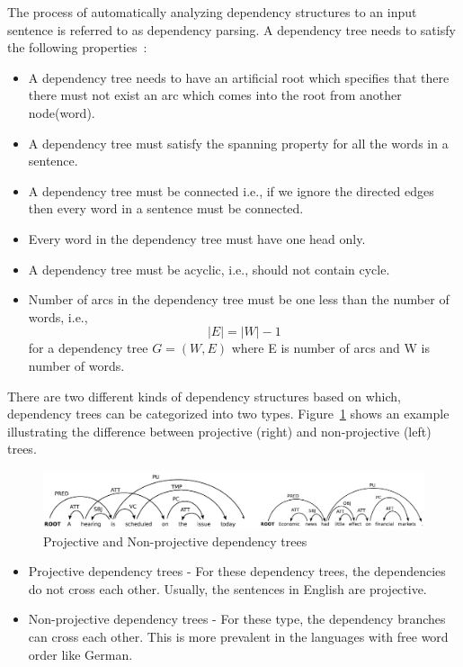 The process of automatically analyzing dependency structures to an input sentence is referred to as dependency parsing. A dependency tree needs to satisfy the following properties~\citep{kubler2009dependency}:
\begin{itemize}
\item A dependency tree needs to have an artificial root which specifies that there there must not exist an arc which comes into the root from another node(word).
\item A dependency tree must satisfy the spanning property for all the words in a sentence.
\item A dependency tree must be connected i.e., if we ignore the directed edges then every word in a sentence must be connected.
\item Every word in the dependency tree must have one head only.
\item A dependency tree must be acyclic, i.e., should not contain cycle.
\item Number of arcs in the dependency tree must be one less than the number of words, i.e., $$|E| = |W| - 1$$ for a dependency tree $G = (W,E)$ where E is number of arcs and W is number of words.
\end{itemize}

There are two different kinds of dependency structures based on which, dependency trees can be categorized into two types. Figure~\ref{fig:proj-non-proj} shows an example illustrating the difference between projective (right) and non-projective (left) trees.  

\begin{figure}[t]
    \centering
    \includegraphics[scale = 0.5]{figures/proj-non-proj.png}
    \centering
    \caption{Projective and Non-projective dependency trees~\citep{kubler2009dependency}}
    \label{fig:proj-non-proj}
\end{figure}

\begin{itemize}
    \item Projective dependency trees - For these dependency trees, the dependencies do not cross each other. Usually, the sentences in English are projective.
    \item Non-projective dependency trees - For these type, the dependency branches can cross each other. This is more prevalent in the languages with free word order like German.
    
\end{itemize}


